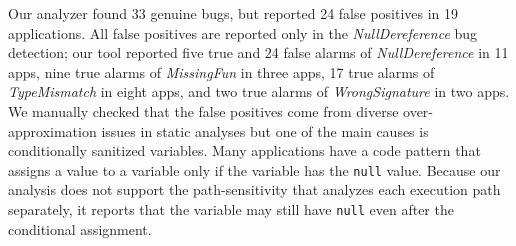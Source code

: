 Our analyzer found 33 genuine bugs, but reported 24 false positives in 19
applications. All false positives are reported only in the {\it
NullDereference} bug detection; our tool reported five true and 24 false alarms
of {\it NullDereference} in 11 apps, nine true alarms of {\it MissingFun} in
three apps, 17 true alarms of {\it TypeMismatch} in eight apps, and two true
alarms of {\it WrongSignature} in two apps. We manually checked that the false
positives come from diverse over-approximation issues in static analyses but
one of the main causes is conditionally sanitized variables.  Many applications
have a code pattern that assigns a value to a variable only if the variable has
the {\tt null} value. Because our analysis does not support the
path-sensitivity that analyzes each execution path separately, it reports that
the variable may still have {\tt null} even after the conditional assignment. 


